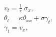 \documentclass[a4paper,11pt]{article}
\theoremstyle{remark}
\begin{document}
%
%
%
%
\begin{equation}
  \label{sbeq}
  \begin{aligned}
    & v_{t} = \frac{1}{r}\ \sigma_{x},\\
    & \theta_{t} = \kappa \theta_{ x x}  +  \sigma \gamma_{t}, \\
    & \gamma_{t} = v_{x},
  \end{aligned}
\end{equation}
%
\end{document}
